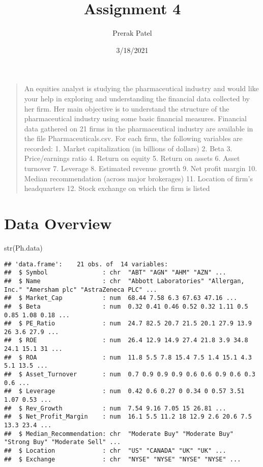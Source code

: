 \documentclass[
]{article}
\title{Assignment 4}
\author{Prerak Patel}
\date{3/18/2021}
\newenvironment{Shaded}{\begin{snugshade}}{\end{snugshade}}
\newcommand{\FunctionTok}[1]{\textcolor[rgb]{0.00,0.00,0.00}{#1}}
\newcommand{\NormalTok}[1]{#1}
\begin{document}
\maketitle

\begin{quote}
An equities analyst is studying the pharmaceutical industry and would
like your help in exploring and understanding the financial data
collected by her firm. Her main objective is to understand the structure
of the pharmaceutical industry using some basic financial measures.
Financial data gathered on 21 firms in the pharmaceutical industry are
available in the file Pharmaceuticals.csv. For each firm, the following
variables are recorded: 1. Market capitalization (in billions of
dollars) 2. Beta 3. Price/earnings ratio 4. Return on equity 5. Return
on assets 6. Asset turnover 7. Leverage 8. Estimated revenue growth 9.
Net profit margin 10. Median recommendation (across major brokerages)
11. Location of firm's headquarters 12. Stock exchange on which the firm
is listed
\end{quote}

\hypertarget{data-overview}{%
\section{Data Overview}\label{data-overview}}

\begin{Shaded}
\begin{Highlighting}[]
\FunctionTok{str}\NormalTok{(Ph.data)}
\end{Highlighting}
\end{Shaded}

\begin{verbatim}
## 'data.frame':    21 obs. of  14 variables:
##  $ Symbol               : chr  "ABT" "AGN" "AHM" "AZN" ...
##  $ Name                 : chr  "Abbott Laboratories" "Allergan, Inc." "Amersham plc" "AstraZeneca PLC" ...
##  $ Market_Cap           : num  68.44 7.58 6.3 67.63 47.16 ...
##  $ Beta                 : num  0.32 0.41 0.46 0.52 0.32 1.11 0.5 0.85 1.08 0.18 ...
##  $ PE_Ratio             : num  24.7 82.5 20.7 21.5 20.1 27.9 13.9 26 3.6 27.9 ...
##  $ ROE                  : num  26.4 12.9 14.9 27.4 21.8 3.9 34.8 24.1 15.1 31 ...
##  $ ROA                  : num  11.8 5.5 7.8 15.4 7.5 1.4 15.1 4.3 5.1 13.5 ...
##  $ Asset_Turnover       : num  0.7 0.9 0.9 0.9 0.6 0.6 0.9 0.6 0.3 0.6 ...
##  $ Leverage             : num  0.42 0.6 0.27 0 0.34 0 0.57 3.51 1.07 0.53 ...
##  $ Rev_Growth           : num  7.54 9.16 7.05 15 26.81 ...
##  $ Net_Profit_Margin    : num  16.1 5.5 11.2 18 12.9 2.6 20.6 7.5 13.3 23.4 ...
##  $ Median_Recommendation: chr  "Moderate Buy" "Moderate Buy" "Strong Buy" "Moderate Sell" ...
##  $ Location             : chr  "US" "CANADA" "UK" "UK" ...
##  $ Exchange             : chr  "NYSE" "NYSE" "NYSE" "NYSE" ...
\end{verbatim}
\end{document}

